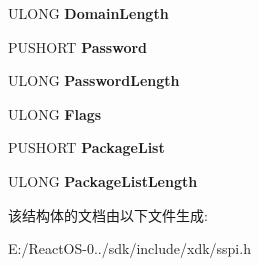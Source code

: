 \begin{DoxyCompactItemize}
U\+L\+O\+NG {\bfseries Domain\+Length}
\item 
\mbox{\label{struct___s_e_c___w_i_n_n_t___a_u_t_h___i_d_e_n_t_i_t_y___e_x_w_a217807475bffa61523d211309893d8ad}} 
P\+U\+S\+H\+O\+RT {\bfseries Password}
\item 
\mbox{\label{struct___s_e_c___w_i_n_n_t___a_u_t_h___i_d_e_n_t_i_t_y___e_x_w_a4a31366fdf6e76bbaf440f291c76fd8b}} 
U\+L\+O\+NG {\bfseries Password\+Length}
\item 
\mbox{\label{struct___s_e_c___w_i_n_n_t___a_u_t_h___i_d_e_n_t_i_t_y___e_x_w_a65632572c25224830aff53a8b90e83fd}} 
U\+L\+O\+NG {\bfseries Flags}
\item 
\mbox{\label{struct___s_e_c___w_i_n_n_t___a_u_t_h___i_d_e_n_t_i_t_y___e_x_w_aa107d9c3b8c60649e476fc9b6a2ece13}} 
P\+U\+S\+H\+O\+RT {\bfseries Package\+List}
\item 
\mbox{\label{struct___s_e_c___w_i_n_n_t___a_u_t_h___i_d_e_n_t_i_t_y___e_x_w_aa1f09d55d0297a16a7ef75ad425ded07}} 
U\+L\+O\+NG {\bfseries Package\+List\+Length}
\end{DoxyCompactItemize}


该结构体的文档由以下文件生成\+:\begin{DoxyCompactItemize}
\item 
E\+:/\+React\+O\+S-\/0../sdk/include/xdk/sspi.\+h\end{DoxyCompactItemize}
